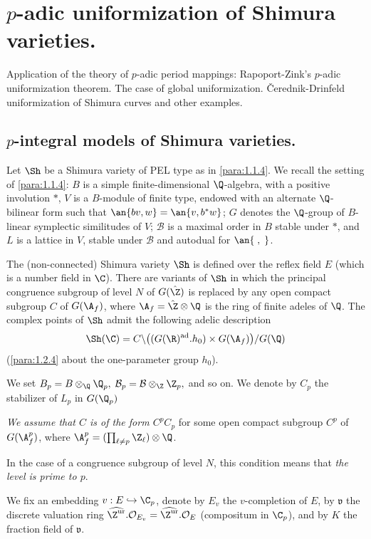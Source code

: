 \newpage
\section{$p$-adic uniformization of Shimura varieties.}\label{sec:7}

\begin{abst}
 Application of the theory of $p$-adic period mappings: Rapoport-Zink's
 $p$-adic uniformization theorem. The case of global uniformization.
 \v{C}erednik-Drinfeld uniformization of Shimura curves and
 other examples.
\end{abst}

\subsection{$p$-integral models of Shimura varieties.}\label{sub:7.1}

\begin{para}\label{para:7.1.1} Let $\Sh$ be a Shimura variety of PEL type as
 in \ref{para:1.1.4}. We recall the setting of \ref{para:1.1.4}: $B$ is
 a simple finite-dimensional $\Q$-algebra, with a positive involution
 $\ast$, $V$ is a $B$-module 
 of finite type, endowed with an alternate $\Q$-bilinear form such that
 $\an{bv,w}=\an{v,b^\ast w}$; 
 $G$ denotes the $\Q$-group of
 $B$-linear symplectic similitudes of $V$; $\mathcal{B}$ is a maximal
 order in $B$ stable under $\ast$, and 
 $L$ is a lattice in $V$, stable under $\mathcal{B}$ and autodual for
 $\an{\;,\;}$.

 The (non-connected) Shimura variety $\Sh$ is defined over the reflex
 field $E$ (which is a number field in $\C$).  There are variants of
 $\Sh$ in which the principal congruence subgroup of level $N$ of
 $G(\hat\Z)$ is replaced by any open compact subgroup $C$ of $G(\A_f)$,
 where $\A_f=\hat\Z\otimes \Q$ is the ring of finite adeles of $\Q$. The
 complex points of $\Sh$ admit the following adelic description
\begin{equation*}
\Sh(\C)=C\backslash \bigl((G(\R)^{\mathrm{ad}}.h_0) \times G(\A_f)\bigr) /G(\Q)
\end{equation*}
(\cf \ref{para:1.2.4} about the one-parameter group $h_0$). 
\end{para}

\begin{para}\label{para:7.1.2} We set $B_p=B\otimes_{\Q}
 \Q_p,\;\mathcal{B}_p=\mathcal{B}\otimes_\Z \Z_p,$ and so on. We denote
 by $C_p$ the stabilizer of $L_p$ in $G(\Q_p)$

 {\it We assume that $C$ is of the form $C^pC_p$} for some open compact
 subgroup $C^p$ of $G(\A_f^p)$, where $\A_f^p=(\prod_{\ell\neq
 p} \Z_\ell)\otimes \Q$. 


 In the case of a congruence subgroup of level $N$, this condition means
 that {\it the level is prime to $p$}. 

 We fix an embedding $v: E\hookrightarrow
 \C_p$, denote by $E_v$ the $v$-completion of $E$, by $\mathfrak{v}$ the
 discrete valuation ring
 $\widehat{\Z^{\mathrm{ur}}}.\mathcal{O}_{E_v}=
 \widehat{\Z^{\mathrm{ur}}}.\mathcal{O}_E$ 
 (compositum in $\C_p$), and by $K$ the fraction field of $\mathfrak{v}$.
\end{para}

